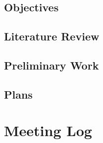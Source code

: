 \documentclass[11pt, a4paper]{report}
\begin{document}
\vspace*{10pt}

\subsection*{Objectives}

\subsection*{Literature Review}
\subsection*{Preliminary Work}
\subsection*{Plans}

\section*{Meeting Log}


\end{document}
